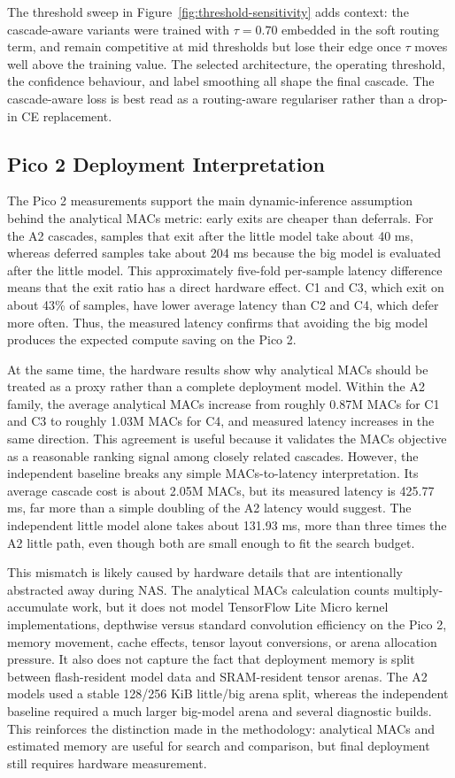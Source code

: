 \documentclass[conference]{IEEEtran}
\begin{document}
The threshold sweep in Figure~\ref{fig:threshold-sensitivity} adds
context: the cascade-aware variants were trained with $\tau=0.70$ embedded
in the soft routing term, and remain competitive at mid thresholds but
lose their edge once $\tau$ moves well above the training value. The
selected architecture, the operating threshold, the confidence behaviour,
and label smoothing all shape the final cascade. The cascade-aware loss is
best read as a routing-aware regulariser rather than a drop-in CE
replacement.

\subsection{Pico 2 Deployment Interpretation}

The Pico 2 measurements support the main dynamic-inference assumption behind
the analytical MACs metric: early exits are cheaper than deferrals. For the
A2 cascades, samples that exit after the little model take about 40 ms,
whereas deferred samples take about 204 ms because the big model is evaluated
after the little model. This approximately five-fold per-sample latency
difference means that the exit ratio has a direct hardware effect. C1 and C3,
which exit on about 43\% of samples, have lower average latency than C2 and C4,
which defer more often. Thus, the measured latency confirms that avoiding the
big model produces the expected compute saving on the Pico 2.

At the same time, the hardware results show why analytical MACs should be
treated as a proxy rather than a complete deployment model. Within the A2
family, the average analytical MACs increase from roughly 0.87M MACs for C1
and C3 to roughly 1.03M MACs for C4, and measured latency increases in the same
direction. This agreement is useful because it validates the MACs objective as
a reasonable ranking signal among closely related cascades. However, the
independent baseline breaks any simple MACs-to-latency interpretation. Its
average cascade cost is about 2.05M MACs, but its measured latency is 425.77
ms, far more than a simple doubling of the A2 latency would suggest. The
independent little model alone takes about 131.93 ms, more than three times the
A2 little path, even though both are small enough to fit the search budget.

This mismatch is likely caused by hardware details that are intentionally
abstracted away during NAS. The analytical MACs calculation counts multiply-
accumulate work, but it does not model TensorFlow Lite Micro kernel
implementations, depthwise versus standard convolution efficiency on the Pico
2, memory movement, cache effects, tensor layout conversions, or arena
allocation pressure. It also does not capture the fact that deployment memory
is split between flash-resident model data and SRAM-resident tensor arenas. The
A2 models used a stable 128/256 KiB little/big arena split, whereas the
independent baseline required a much larger big-model arena and several
diagnostic builds. This reinforces the distinction made in the methodology:
analytical MACs and estimated memory are useful for search and comparison, but
final deployment still requires hardware measurement.
\end{document}
